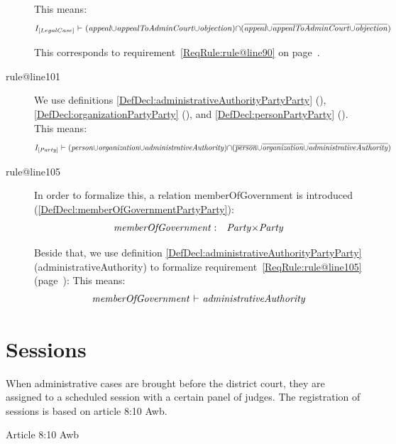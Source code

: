 \documentclass[10pt,a4paper]{report}              %
\theoremstyle{plain}\theorembodyfont{\rmfamily}\newtheorem{definition}{Definition}[section]
\theoremstyle{plain}\theorembodyfont{\rmfamily}\newtheorem{designrule}[definition]{Requirement}
\def\id#1{\mbox{\em #1\/}}
\newcommand{\cmpl}[1]{\overline{#1}}
\begin{document}
\begin{description}
This means: 
\begin{equation}
   I_{[LegalCase]}\ {\vdash}\ ({\id{appeal}}{\cup}{\id{appealToAdminCourt}}{\cup}{\id{objection}}){\cap}(\cmpl{{\id{appeal}}}{\cup}\cmpl{{\id{appealToAdminCourt}}}{\cup}\cmpl{{\id{objection}}})\label{DefRule:rule@line90}
\end{equation}

This corresponds to requirement~\ref{ReqRule:rule@line90} on page~\pageref{ReqRule:rule@line90}.
\item[rule@line101]
We use definitions \ref{DefDecl:administrativeAuthorityPartyParty} ({}), \ref{DefDecl:organizationPartyParty} ({}), and \ref{DefDecl:personPartyParty} ({}). 
This means: 
\begin{equation}
   I_{[Party]}\ {\vdash}\ ({\id{person}}{\cup}{\id{organization}}{\cup}{\id{administrativeAuthority}}){\cap}(\cmpl{{\id{person}}}{\cup}\cmpl{{\id{organization}}}{\cup}\cmpl{{\id{administrativeAuthority}}})\label{DefRule:rule@line101}
\end{equation}

\item[rule@line105]
In order to formalize this, a relation
memberOfGovernment is introduced (\ref{DefDecl:memberOfGovernmentPartyParty}):
\begin{eqnarray}
   {\id{memberOfGovernment}}&:&{\id{Party}}{\times}{\id{Party}}\label{DefDecl:memberOfGovernmentPartyParty}
\end{eqnarray}

Beside that, we use definition \ref{DefDecl:administrativeAuthorityPartyParty}
(administrativeAuthority) to formalize requirement~\ref{ReqRule:rule@line105} (page~\pageref{ReqRule:rule@line105}):
This means: 
\begin{equation}
   {\id{memberOfGovernment}}\ {\vdash}\ {\id{administrativeAuthority}}\label{DefRule:rule@line105}
\end{equation}

\end{description}
\section{Sessions}

When administrative cases are brought before the district court, they
are assigned to a scheduled session with a certain panel of judges. The
registration of sessions is based on article 8:10 Awb.

Article 8:10 Awb
\end{document}

